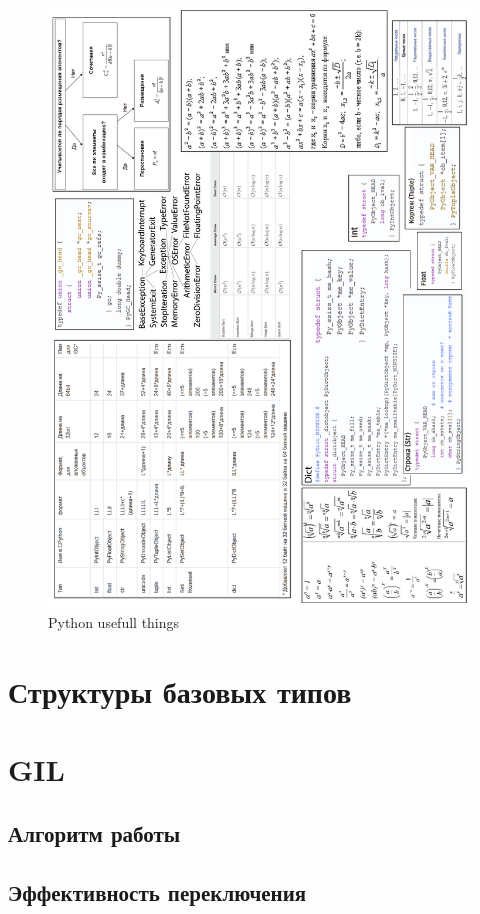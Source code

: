 \begin{figure}
\centering
\includegraphics[width=\textwidth]{py_data_size.png}
\caption{Python usefull things}
\label{scheme}
\end{figure}

\section{Структуры базовых типов}

\section{GIL}

\subsection{Алгоритм работы}
\subsection{Эффективность переключения}

